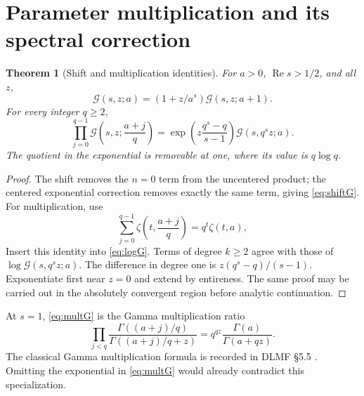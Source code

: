\documentclass[11pt]{article}
\numberwithin{equation}{section}
\newtheorem{theorem}{Theorem}[section]
\theoremstyle{definition}\newtheorem{definition}[theorem]{Definition}
\theoremstyle{remark}\newtheorem{remark}[theorem]{Remark}
\DeclareMathOperator{\Rea}{Re}
\newcommand{\G}{\mathcal G}\newcommand{\F}{\mathfrak F}
\begin{document}
\section{Parameter multiplication and its spectral correction}
\label{sec:multiplication}
\begin{theorem}[Shift and multiplication identities]
\label{thm:multiplication}
For $a>0$, $\Rea s>1/2$, and all $z$,
\begin{equation}
 \G(s,z;a)=(1+z/a^s)\G(s,z;a+1).
 \label{eq:shiftG}
\end{equation}
For every integer $q\ge2$,
\begin{equation}
 \boxed{\prod_{j=0}^{q-1}\G\left(s,z;\frac{a+j}{q}\right)
 =\exp\left(z\frac{q^s-q}{s-1}\right)\G(s,q^sz;a)}.
 \label{eq:multG}
\end{equation}
The quotient in the exponential is removable at one, where its value is
$q\log q$.
\end{theorem}
\begin{proof}
The shift removes the $n=0$ term from the uncentered product; the centered
exponential correction removes exactly the same term, giving
\eqref{eq:shiftG}. For multiplication, use
\[
 \sum_{j=0}^{q-1}\zeta\left(t,\frac{a+j}{q}\right)=q^t\zeta(t,a),
\]
Insert this identity into \eqref{eq:logG}. Terms of degree $k\ge2$ agree
with those of $\log\G(s,q^sz;a)$. The difference in degree one is
$z(q^s-q)/(s-1)$. Exponentiate first near $z=0$ and extend by entireness.
The same proof may be carried out in the absolutely convergent region
before analytic continuation.
\end{proof}
At $s=1$, \eqref{eq:multG} is the Gamma multiplication ratio
\begin{equation}
 \prod_{j<q}\frac{\Gamma((a+j)/q)}{\Gamma((a+j)/q+z)}
       =q^{qz}\frac{\Gamma(a)}{\Gamma(a+qz)}.
 \label{eq:gammamult}
\end{equation}
The classical Gamma multiplication formula is recorded in DLMF \S5.5
\cite{DLMFmult}. Omitting the exponential in \eqref{eq:multG} would already
contradict this specialization.
\end{document}
